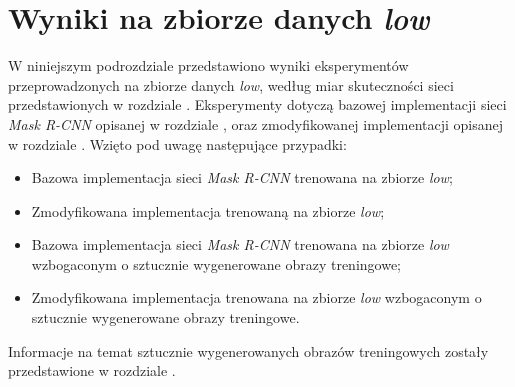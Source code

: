 \section{Wyniki na zbiorze danych \textit{low}}
W niniejszym podrozdziale przedstawiono wyniki eksperymentów przeprowadzonych na zbiorze danych \textit{low}, według miar skuteczności sieci przedstawionych w rozdziale .
Eksperymenty dotyczą bazowej implementacji sieci \textit{Mask R-CNN} \cite{matterport-mask-rcnn} opisanej w rozdziale , oraz zmodyfikowanej implementacji opisanej w rozdziale .
 Wzięto pod uwagę następujące przypadki:

\begin{itemize}
 \item Bazowa implementacja sieci \textit{Mask R-CNN} trenowana na zbiorze \textit{low};
 \item Zmodyfikowana implementacja trenowaną na zbiorze \textit{low};
 \item Bazowa implementacja sieci \textit{Mask R-CNN} trenowana na zbiorze \textit{low} wzbogaconym o sztucznie wygenerowane obrazy treningowe;
 \item Zmodyfikowana implementacja trenowana na zbiorze \textit{low} wzbogaconym o sztucznie wygenerowane obrazy treningowe.
\end{itemize}

Informacje na temat sztucznie wygenerowanych obrazów treningowych zostały przedstawione w rozdziale .
